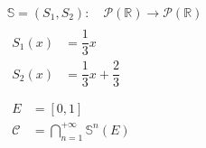 \documentclass[preview]{standalone}
\begin{document}
\begin{center}
\begin{gather*}
                \mathbb{S} = (S_1,S_2)\colon\quad\mathcal{P}(\mathbb{R})\rightarrow\mathcal{P}(\mathbb{R})\\[10pt]
                \begin{aligned}
                    S_1(x) &= \dfrac{1}{3}x\\
                    S_2(x) &= \dfrac{1}{3}x + \dfrac{2}{3}\\
                \end{aligned}\\[10pt]
                \begin{aligned}
                    E &= [0, 1]\\
                    \mathcal{C} &= \bigcap_{n=1}^{+\infty}\mathbb{S}^n(E)
                \end{aligned}
            \end{gather*}
\end{center}
\end{document}
